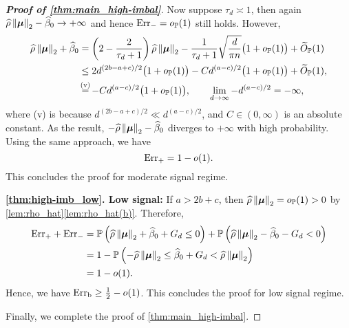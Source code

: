 \begin{proof}[\textbf{Proof of \cref{thm:main_high-imbal}}]
\vspace{0.5\baselineskip}
\noindent
Now suppose $\tau_d \asymp 1$, then again $\widehat\rho \left\|{{\boldsymbol{\mu}}}\right\|_2 - \widehat\beta_0 \to + \infty$ and hence $\mathrm{Err}_- = o_{\mathbb{P}}(1)$ still holds. However,
\begin{align*}
        \hat\rho \norm{\vmu}_2 + \hat\beta_0 
        & = \left(2 - \frac{2}{\tau_d + 1}\right) \hat\rho\norm{\vmu}_2 
        - \frac{1}{\tau_d + 1}\sqrt{\frac{d}{\pi n}}\bigl(1 + o_{\P}(1)\bigr) 
        + \wt O_\P(1)  \\
        & \le 2 d^{(2b-a+c)/2} \bigl(1 + o_{\P}(1)\bigr) - C d^{(a-c)/2} \bigl(1 + o_{\P}(1)\bigr) + \wt O_\P(1), \\
        & \overset{\mathmakebox[0pt][c]{\text{(v)}}}{=} - C d^{(a-c)/2} \bigl(1 + o_{\P}(1)\bigr),
        \qquad 
        \lim_{d \to \infty} -d^{(a-c)/2} = -\infty,
\end{align*}
where (v) is because $d^{(2b-a+c)/2} \ll d^{(a-c)/2}$, and $C \in (0, \infty)$ is an absolute constant. As the result, $- \widehat\rho \left\|{{\boldsymbol{\mu}}}\right\|_2 - \widehat\beta_0 $ diverges to $+\infty$ with high probability. Using the same approach, we have
\begin{equation*}
    \mathrm{Err}_+ = 1 - o(1).
\end{equation*}
This concludes the proof for moderate signal regime.




\vspace{0.5\baselineskip}
\noindent
\textbf{\ref{thm:high-imb_low}. Low signal:}
If $a > 2b + c$, then $\widehat\rho \left\|{{\boldsymbol{\mu}}}\right\|_2 = o_{\mathbb{P}}(1) > 0$ by \cref{lem:rho_hat}\ref{lem:rho_hat(b)}. Therefore,
\begin{align*}
        \mathrm{Err}_+ + \mathrm{Err}_- & 
        = \mathbb{P}\left( \widehat\rho \left\|{{\boldsymbol{\mu}}}\right\|_2 + \widehat\beta_0 + G_d \le 0 \right) 
        + \mathbb{P}\left( \widehat\rho \left\|{{\boldsymbol{\mu}}}\right\|_2 - \widehat\beta_0 - G_d < 0 \right) \\
        & = 
        1 - \mathbb{P}\left( - \widehat\rho \left\|{{\boldsymbol{\mu}}}\right\|_2 \le \widehat\beta_0 + G_d < \widehat\rho \left\|{{\boldsymbol{\mu}}}\right\|_2 \right)
        \\
        & = 1 - o(1).
\end{align*}
Hence, we have $\mathrm{Err}_\mathrm{b} \ge \frac12 - o(1)$. This concludes the proof for low signal regime.


Finally, we complete the proof of \cref{thm:main_high-imbal}.
\end{proof}


